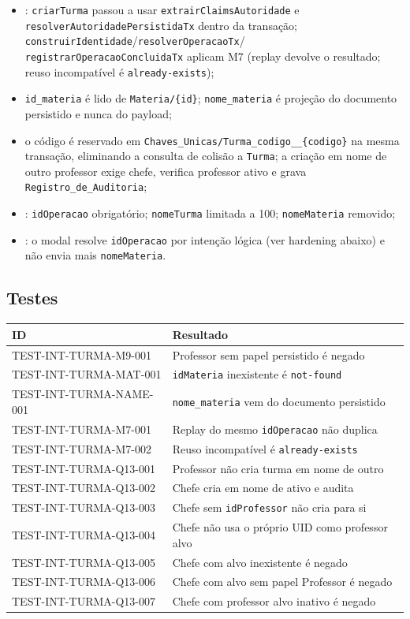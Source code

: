 \begin{itemize}
  \item {}: \texttt{criarTurma} passou a usar
  \texttt{extrairClaimsAutoridade} e \texttt{resolverAutoridadePersistidaTx}
  dentro da transação; \texttt{construirIdentidade}/\texttt{resolverOperacaoTx}/
  \texttt{registrarOperacaoConcluidaTx} aplicam M7 (replay devolve o resultado;
  reuso incompatível é \texttt{already-exists});
  \item \texttt{id\_materia} é lido de \texttt{Materia/\{id\}}; \texttt{nome\_materia}
  é projeção do documento persistido e nunca do payload;
  \item o código é reservado em \texttt{Chaves\_Unicas/Turma\_codigo\_\_\{codigo\}}
  na mesma transação, eliminando a consulta de colisão a \texttt{Turma}; a
  criação em nome de outro professor exige chefe, verifica professor ativo e
  grava \texttt{Registro\_de\_Auditoria};
  \item {}: \texttt{idOperacao}
  obrigatório; \texttt{nomeTurma} limitada a 100; \texttt{nomeMateria} removido;
  \item {}: o modal
  resolve \texttt{idOperacao} por intenção lógica (ver hardening abaixo) e não
  envia mais \texttt{nomeMateria}.
\end{itemize}

\subsection{Testes}

\small
\begin{longtable}{@{}p{}p{}@{}}
\toprule
ID & Resultado \\
\midrule
\endhead
TEST-INT-TURMA-M9-001 & Professor sem papel persistido é negado \\
TEST-INT-TURMA-MAT-001 & \texttt{idMateria} inexistente é \texttt{not-found} \\
TEST-INT-TURMA-NAME-001 & \texttt{nome\_materia} vem do documento persistido \\
TEST-INT-TURMA-M7-001 & Replay do mesmo \texttt{idOperacao} não duplica \\
TEST-INT-TURMA-M7-002 & Reuso incompatível é \texttt{already-exists} \\
TEST-INT-TURMA-Q13-001 & Professor não cria turma em nome de outro \\
TEST-INT-TURMA-Q13-002 & Chefe cria em nome de ativo e audita \\
TEST-INT-TURMA-Q13-003 & Chefe sem \texttt{idProfessor} não cria para si \\
TEST-INT-TURMA-Q13-004 & Chefe não usa o próprio UID como professor alvo \\
TEST-INT-TURMA-Q13-005 & Chefe com alvo inexistente é negado \\
TEST-INT-TURMA-Q13-006 & Chefe com alvo sem papel Professor é negado \\
TEST-INT-TURMA-Q13-007 & Chefe com professor alvo inativo é negado \\
\bottomrule
\end{longtable}
\normalsize

